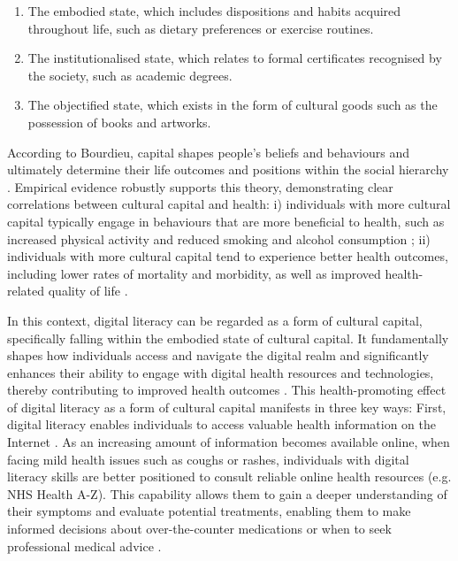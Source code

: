 \begin{enumerate}
    \item The embodied state, which includes dispositions and habits acquired throughout life, such as dietary preferences or exercise routines.
    \item The institutionalised state, which relates to formal certificates recognised by the society, such as academic degrees.
    \item The objectified state, which exists in the form of cultural goods such as the possession of books and artworks.
\end{enumerate}

According to Bourdieu, capital shapes people's beliefs and behaviours and ultimately determine their life outcomes and positions within the social hierarchy \parencite{xu_individual_2020}. Empirical evidence robustly supports this theory, demonstrating clear correlations between cultural capital and health: i) individuals with more cultural capital typically engage in behaviours that are more beneficial to health, such as increased physical activity and reduced smoking and alcohol consumption \parencite{shim_cultural_2010}; ii) individuals with more cultural capital tend to experience better health outcomes, including lower rates of mortality and morbidity, as well as improved health-related quality of life \parencite{abel_cultural_2008}.

In this context, digital literacy can be regarded as a form of cultural capital, specifically falling within the embodied state of cultural capital. It fundamentally shapes how individuals access and navigate the digital realm and significantly enhances their ability to engage with digital health resources and technologies, thereby contributing to improved health outcomes \parencite{adkins_health_2009}. This health-promoting effect of digital literacy as a form of cultural capital manifests in three key ways: First, digital literacy enables individuals to access valuable health information on the Internet \parencite{sorensen_health_2015}. As an increasing amount of information becomes available online, when facing mild health issues such as coughs or rashes, individuals with digital literacy skills are better positioned to consult reliable online health resources (e.g. NHS Health A-Z). This capability allows them to gain a deeper understanding of their symptoms and evaluate potential treatments, enabling them to make informed decisions about over-the-counter medications or when to seek professional medical advice \parencite{aboueid_use_2019}.

